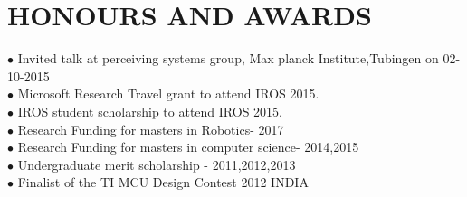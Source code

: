 \documentclass[a4paper,10pt]{article}
\begin{document}



\vspace{-4 mm}

\section{HONOURS AND AWARDS}
$\bullet$  Invited talk at perceiving systems group, Max planck Institute,Tubingen on 02-10-2015\\
$\bullet$  Microsoft Research Travel grant to attend IROS 2015.\\
$\bullet$ IROS student scholarship to attend IROS 2015.\\
$\bullet$ Research Funding for masters in Robotics- 2017\\
$\bullet$ Research Funding for masters in computer science- 2014,2015\\
$\bullet$  Undergraduate merit scholarship - 2011,2012,2013\\
$\bullet$  Finalist of the TI MCU Design Contest 2012 INDIA \\



\vspace{-4 mm}
\end{document}
